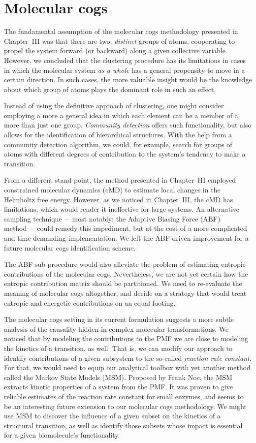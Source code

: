 \section{Molecular cogs}

The fundamental assumption of the molecular cogs methodology presented in Chapter~III was that there are two, \emph{distinct} groups of atoms, cooperating to propel the system forward (or backward) along a given collective variable.
However, we concluded that the clustering procedure has its limitations in cases in which the molecular system \emph{as a whole} has a general propensity to move in a certain direction.
In such cases, the more valuable insight would be the knowledge about which group of atoms plays the dominant role in such an effect.

Instead of using the definitive approach of clustering, one might consider employing a more a general idea in which each element can be a member of a more than just one group.
\emph{Community detection} offers such functionality, but also allows for the identification of hierarchical structures.
With the help from a community detection algorithm, we could, for example, search for groups of atoms with different degrees of contribution to the system's tendency to make a transition.

From a different stand point, the method presented in Chapter~III employed constrained molecular dynamics (cMD) to estimate local changes in the Helmholtz free energy.
However, as we noticed in Chapter~III, the cMD has limitations, which would render it ineffective for large systems.
An alternative sampling technique~--~most notably: the Adaptive Biasing Force (ABF) method~--~could remedy this impediment, but at the cost of a more complicated and time-demanding implementation.
We left the ABF-driven improvement for a future molecular cogs identification scheme.

The ABF sub-procedure would also alleviate the problem of estimating entropic contributions of the molecular cogs.
Nevertheless, we are not yet certain how the entropic contribution matrix should be partitioned.
We need to re-evaluate the meaning of molecular cogs altogether, and decide on a strategy that would treat entropic and energetic contributions on an equal footing.

The molecular cogs setting in its current formulation suggests a more subtle analysis of the causality hidden in complex molecular transformations.
We noticed that by modeling the contributions to the PMF we are close to modeling the kinetics of a transition, as well.
That is, we can modify our approach to identify contributions of a given subsystem to the so-called \emph{reaction rate constant}.
For that, we would need to equip our analytical toolbox with yet another method called the Markov State Models (MSM).
Proposed by Frank Noe, the MSM extracts kinetic properties of a system from the PMF.
It was proven to give reliable estimates of the reaction rate constant for small enzymes, and seems to be an interesting future extension to our molecular cogs methodology.
We might use MSM to discover the influence of a given subset on the kinetics of a structural transition, as well as identify those subsets whose impact is essential for a given biomolecule's functionality.

